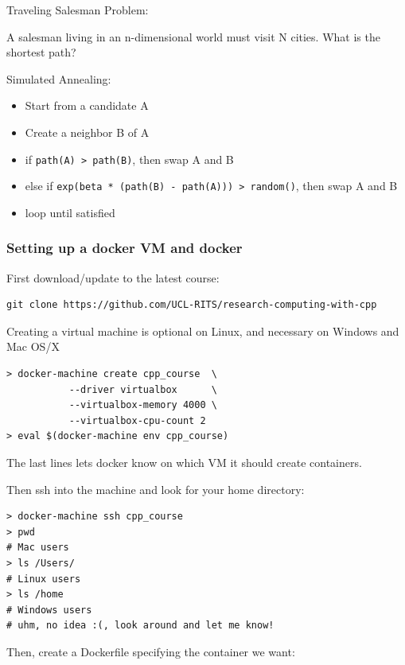 Traveling Salesman Problem:

A salesman living in an n-dimensional world must visit N cities. What is
the shortest path?

Simulated Annealing:

\begin{itemize}
\itemsep1pt\parskip0pt
\item
  Start from a candidate A
\item
  Create a neighbor B of A
\item
  if \texttt{path(A) \textgreater{} path(B)}, then swap A and B
\item
  else if
  \texttt{exp(beta * (path(B) - path(A))) \textgreater{} random()}, then
  swap A and B
\item
  loop until satisfied
\end{itemize}

\subsubsection{Setting up a docker VM and
docker}\label{setting-up-a-docker-vm-and-docker}

First download/update to the latest course:

\begin{verbatim}
git clone https://github.com/UCL-RITS/research-computing-with-cpp
\end{verbatim}

Creating a virtual machine is optional on Linux, and necessary on
Windows and Mac OS/X

\begin{verbatim}
> docker-machine create cpp_course  \
           --driver virtualbox      \
           --virtualbox-memory 4000 \
           --virtualbox-cpu-count 2
> eval $(docker-machine env cpp_course)
\end{verbatim}

The last lines lets docker know on which VM it should create containers.

Then ssh into the machine and look for your home directory:

\begin{verbatim}
> docker-machine ssh cpp_course
> pwd
# Mac users
> ls /Users/
# Linux users
> ls /home
# Windows users
# uhm, no idea :(, look around and let me know!
\end{verbatim}

Then, create a Dockerfile specifying the container we want:

